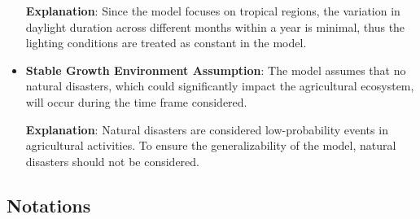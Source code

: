 \documentclass{HZNUMCM}
\begin{document}
\begin{itemize}
        \textbf{Explanation}: Since the model focuses on tropical regions, the variation in daylight duration across different months within a year is minimal, thus the lighting conditions are treated as constant in the model.
        \item \textbf{Stable Growth Environment Assumption}: The model assumes that no natural disasters, which could significantly impact the agricultural ecosystem, will occur during the time frame considered.
  
        \textbf{Explanation}: Natural disasters are considered low-probability events in agricultural activities. To ensure the generalizability of the model, natural disasters should not be considered.
      \end{itemize}
        \subsection{Notations}
\end{document}
